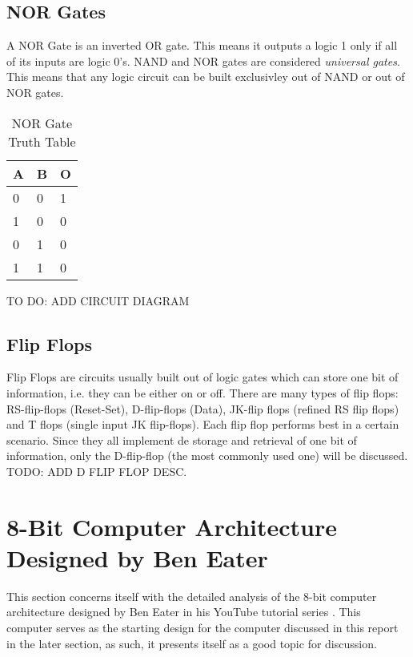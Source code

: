 \subsection{NOR Gates}
A NOR Gate is an inverted OR gate. This means it outputs a logic 1 only if all of its inputs are logic 0's.
NAND and NOR gates are considered \emph{universal gates}. This means that any logic circuit can be built exclusivley out of NAND or out of NOR gates.
\begin{table}[H]
\centering
\begin{tabular}{l|l|l}
\hline
\multicolumn{1}{|l|}{\textbf{A}} & \textbf{B} & \multicolumn{1}{l|}{\textbf{O}} \\ \hline
0                                & 0          & 1                               \\
1                                & 0          & 0                               \\
0                                & 1          & 0                               \\
1                                & 1          & 0
\end{tabular}
\caption{NOR Gate Truth Table}
\label{tab:nor-table}
\end{table}
TO DO: ADD CIRCUIT DIAGRAM

\subsection{Flip Flops}
Flip Flops are circuits usually built out of logic gates which can store one bit of information, i.e. they can be either on or off. There are many types of flip flops: RS-flip-flops (Reset-Set), D-flip-flops (Data), JK-flip flops (refined RS flip flops) and T flops (single input JK flip-flops). Each flip flop performs best in a certain scenario. Since they all implement de storage and retrieval of one bit of information, only the D-flip-flop (the most commonly used one) will be discussed. \\
TODO: ADD D FLIP FLOP DESC.


\section{8-Bit Computer Architecture Designed by Ben Eater \cite{eater2019breadboard}}
This section concerns itself with the detailed analysis of the 8-bit computer architecture designed by Ben Eater in his YouTube tutorial series \cite{eater2019breadboard}. This computer serves as the starting design for the computer discussed in this report in the later section, as such, it presents itself as a good topic for discussion.

